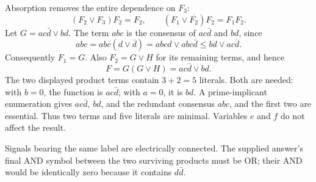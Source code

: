 \begin{solution}
Absorption removes the entire dependence on $F_3$:
\[
(F_2\vee F_3)F_2=F_2,
\qquad (F_1\vee\overline{F_2})F_2=F_1F_2.
\]
Let $G=ac\bar d\vee bd$. The term $abc$ is the consensus of $ac\bar d$ and $bd$, since
\[
abc=abc(d\vee\bar d)=abcd\vee abc\bar d\le bd\vee ac\bar d.
\]
Consequently $F_1=G$. Also $F_2=G\vee H$ for its remaining terms, and hence
\[
\boxed{F=G(G\vee H)=ac\bar d\vee bd.}
\]
The two displayed product terms contain $3+2=5$ literals. Both are needed: with $b=0$, the function is $ac\bar d$; with $a=0$, it is $bd$. A prime-implicant enumeration gives $ac\bar d$, $bd$, and the redundant consensus $abc$, and the first two are essential. Thus two terms and five literals are minimal. Variables $e$ and $f$ do not affect the result.

\begin{center}
\end{center}
Signals bearing the same label are electrically connected. The supplied answer's final AND symbol between the two surviving products must be OR; their AND would be identically zero because it contains $d\bar d$.
\end{solution}

